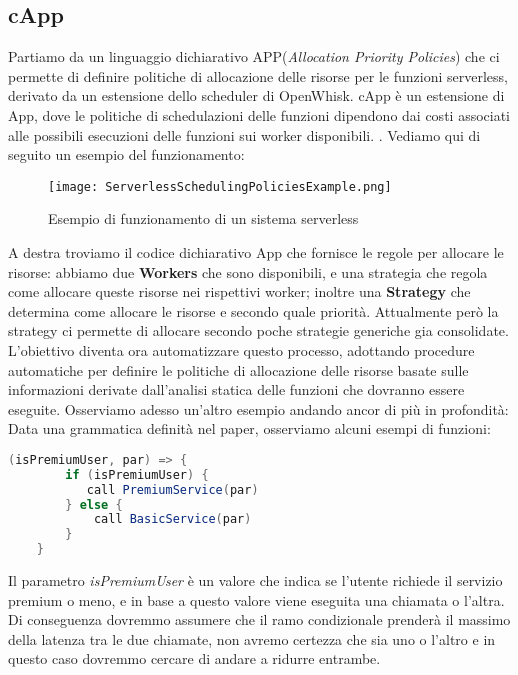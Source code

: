 \documentclass[../../main.tex]{subfiles}
\begin{document}
\subsection{cApp}
Partiamo da un linguaggio dichiarativo APP(\textit{Allocation Priority Policies}) che ci permette di definire politiche di allocazione delle risorse per le funzioni serverless, derivato da un estensione dello scheduler di OpenWhisk.
cApp è un estensione di App, dove le politiche di schedulazioni delle funzioni dipendono dai costi associati alle possibili esecuzioni delle funzioni sui worker disponibili.
\autocite{de2020allocation}.
Vediamo qui di seguito un esempio del funzionamento:
\begin{figure}[H]
   \centering
    \texttt{[image: ServerlessSchedulingPoliciesExample.png]}
    \caption{Esempio di funzionamento di un sistema serverless \autocite{deserverless}}
\end{figure}
A destra troviamo il codice dichiarativo App che fornisce le regole per allocare le risorse: abbiamo due \textbf{Workers} che sono disponibili, e una strategia che regola come allocare queste risorse nei rispettivi worker; inoltre una \textbf{Strategy} che determina come allocare le risorse e secondo quale priorità.
Attualmente però la strategy ci permette di allocare secondo poche strategie generiche gia consolidate.
L'obiettivo diventa ora automatizzare questo processo, adottando procedure automatiche per definire le politiche di allocazione delle risorse basate sulle informazioni derivate dall'analisi statica delle funzioni che dovranno essere eseguite.
Osserviamo adesso un'altro esempio andando ancor di più in profondità:
Data una grammatica definità nel paper\autocite {deserverless}, osserviamo alcuni esempi di funzioni:
\begin{lstlisting}[language=Java, caption= La guardia della condizione è un espressione,label={lst:1}]
    (isPremiumUser, par) => {
        if (isPremiumUser) {
           call PremiumService(par)
        } else {
            call BasicService(par)
        }
    }
\end{lstlisting}

Il parametro \textit{isPremiumUser} è un valore che indica se l'utente richiede il servizio premium o meno, e in base a questo valore viene eseguita una chiamata o l'altra.
Di conseguenza dovremmo assumere che il ramo condizionale prenderà il massimo della latenza tra le due chiamate, non avremo certezza che sia uno o l'altro e in questo caso dovremmo cercare di andare a ridurre entrambe.
\end{document}
